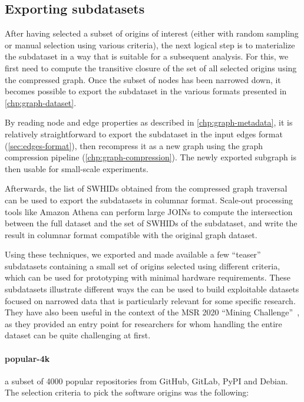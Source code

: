 \subsection{Exporting subdatasets}

After having selected a subset of origins of interest (either with random
sampling or manual selection using various criteria), the next logical step is
to materialize the subdataset in a way that is suitable for a subsequent
analysis.
For this, we first need to compute the transitive closure of the set of all
selected origins using the compressed graph. Once the subset of nodes has been
narrowed down, it becomes possible to export the subdataset in the various
formats presented in \cref{chp:graph-dataset}.

By reading node and edge properties as described in
\cref{chp:graph-metadata}, it is relatively straightforward to export the
subdataset in the input edges format (\cref{sec:edges-format}), then recompress
it as a new graph using the graph compression pipeline
(\cref{chp:graph-compression}). The newly exported subgraph is then usable for
small-scale experiments.

Afterwards, the list of \glspl{SWHID} obtained from the compressed graph
traversal can be used to export the subdatasets in columnar format. Scale-out
processing tools like Amazon Athena can perform large JOINs to compute the
intersection between the full dataset and the set of \glspl{SWHID} of the
subdataset, and write the result in columnar format compatible with the
original graph dataset.

Using these techniques, we exported and made available a few ``teaser''
subdatasets containing a small set of origins selected using different
criteria, which can be used for prototyping with minimal hardware requirements.
These subdatasets illustrate different ways the \SWHGD{} can be used to build
exploitable datasets focused on narrowed data that is particularly relevant for
some specific research. They have also been useful in the context of the
MSR 2020 ``Mining Challenge''~\cite{msr-2020-challenge}, as they provided an
entry point for researchers for whom handling the entire dataset can be quite
challenging at first.

\paragraph{popular-4k} a subset of 4000 popular repositories from
GitHub, GitLab, PyPI and Debian. The selection criteria to pick the software
origins was the following:

